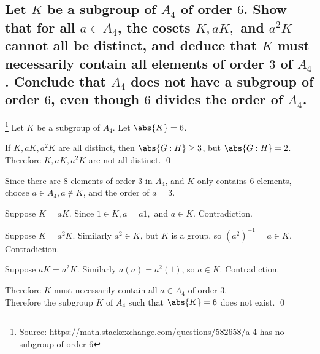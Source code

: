     \subsection[(iii)]{Let $K$ be a subgroup of $A_4$ of order $6$. Show that for all $a \in A_4$,
        the cosets $K, aK,$ and $a^2K$ cannot all be distinct, and deduce that $K$ must necessarily
        contain all elements of order $3$ of $A_4$. Conclude that $A_4$ does not have a subgroup of 
        order $6$, even though $6$ divides the order of $A_4$.}
        
        \footnote{Source: \url{https://math.stackexchange.com/questions/582658/a-4-has-no-subgroup-of-order-6}}
        Let $K$ be a subgroup of $A_4$.
        Let $\abs{K} = 6$.

        

        If $K, aK, a^2K$ are all distinct, then $\abs{G:H} \geq 3$, but $\abs{G:H} = 2$.
        Therefore $K, aK, a^2K$ are not all distinct.
        \qed

        Since there are $8$ elements of order $3$ in $A_4$,
        and $K$ only contains $6$ elements,
        choose $a \in A_4, a \not\in K$, and the order of $a = 3$.

        Suppose $K = aK$.
        Since $1 \in K, a = a1,$ and $a \in K$.
        Contradiction.

        Suppose $K = a^2K$.
        Similarly $a^2 \in K$, but $K$ is a group, so ${(a^2)}^{-1} = a \in K$.
        Contradiction.

        Suppose $aK = a^2K$.
        Similarly $a(a) = a^2 (1) $, so $a \in K$.
        Contradiction.

        Therefore $K$ must necessarily contain all $a\in A_4$ of order $3$.\\
        Therefore the subgroup $K$ of $A_4$ such that $\abs{K}= 6$ does not exist.
        \qed